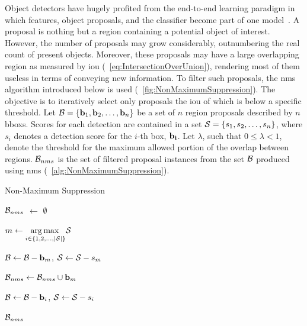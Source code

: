 Object detectors have hugely profited from the end-to-end learning paradigm in which features, object proposals, and the classifier become part of one model~\cite{hosang2017learningnms}. A proposal is nothing but a region containing a potential object of interest. However, the number of proposals may grow considerably, outnumbering the real count of present objects. Moreover, these proposals may have a large overlapping region as measured by \gls{iou} (\sectiontext{}~\ref{eq:IntersectionOverUnion}), rendering most of them useless in terms of conveying new information. To filter such proposals, the \gls{nms} algorithm introduced below is used (\figtext{}~\ref{fig:NonMaximumSuppression}). The objective is to iteratively select only proposals the \gls{iou} of which is below a specific threshold. Let $\mathcal{B} = \left\{ {\mathbf{b}_1, \mathbf{b}_2, \dots, \mathbf{b}_n} \right\}$ be a set of $n$ region proposals described by $n$ \glspl{bbox}. Scores for each detection are contained in a set $\mathcal{S} = \left\{ {s_1, s_2, \dots, s_n} \right\}$, where $s_i$ denotes a detection score for the $i$-th box, $\mathbf{b_i}$. Let $\lambda$, such that $0 \leq \lambda < 1$, denote the threshold for the maximum allowed portion of the overlap between regions. $\mathcal{B}_{nms}$ is the set of filtered proposal instances from the set $\mathcal{B}$ produced using \gls{nms} (\algtext{}~\ref{alg:NonMaximumSuppression}).

\begin{algorithm}[t]
    \caption{Non-Maximum Suppression}
    \label{alg:NonMaximumSuppression}
    \begin{algorithmic}[1]

        \State $\mathcal{B}_{nms}$ $\gets$ $\emptyset$


        \State $m \gets \underset{i \in \left\{ {1, 2, \dots, \left\vert \mathcal{S} \right\vert} \right\}}{\operatorname*{arg\,max}{}} \mathcal{S}$

        \State $\mathcal{B} \gets \mathcal{B} - \mathbf{b}_m$, $\mathcal{S} \gets \mathcal{S} - s_m$

        \State $\mathcal{B}_{nms} \gets \mathcal{B}_{nms} \cup \mathbf{b}_m$



        \State $\mathcal{B} \gets \mathcal{B} - \mathbf{b}_i$, $\mathcal{S} \gets \mathcal{S} - s_i$
        \EndIf
        \EndFor
        \EndWhile

        \State \Return $\mathcal{B}_{nms}$
        \EndFunction
    \end{algorithmic}
\end{algorithm}

